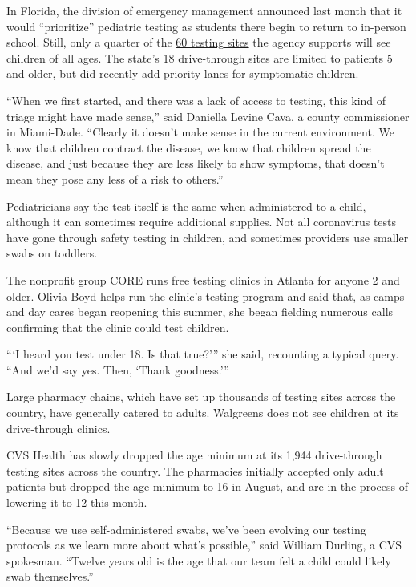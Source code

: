 In Florida, the division of emergency management announced last month
that it would ``prioritize'' pediatric testing as students there begin
to return to in-person school. Still, only a quarter of the
\href{https://www.floridadisaster.org/news-media/news/20200803-state-of-florida-prioritizes-symptomatic-vulnerable-and-pediatric-populations-at-state-supported-covid-19-testing-sites/}{60
testing sites} the agency supports will see children of all ages. The
state's 18 drive-through sites are limited to patients 5 and older, but
did recently add priority lanes for symptomatic children.

``When we first started, and there was a lack of access to testing, this
kind of triage might have made sense,'' said Daniella Levine Cava, a
county commissioner in Miami-Dade. ``Clearly it doesn't make sense in
the current environment. We know that children contract the disease, we
know that children spread the disease, and just because they are less
likely to show symptoms, that doesn't mean they pose any less of a risk
to others.''

Pediatricians say the test itself is the same when administered to a
child, although it can sometimes require additional supplies. Not all
coronavirus tests have gone through safety testing in children, and
sometimes providers use smaller swabs on toddlers.

The nonprofit group CORE runs free testing clinics in Atlanta for anyone
2 and older. Olivia Boyd helps run the clinic's testing program and said
that, as camps and day cares began reopening this summer, she began
fielding numerous calls confirming that the clinic could test children.

```I heard you test under 18. Is that true?''' she said, recounting a
typical query. ``And we'd say yes. Then, `Thank goodness.'''

Large pharmacy chains, which have set up thousands of testing sites
across the country, have generally catered to adults. Walgreens does not
see children at its drive-through clinics.

CVS Health has slowly dropped the age minimum at its 1,944 drive-through
testing sites across the country. The pharmacies initially accepted only
adult patients but dropped the age minimum to 16 in August, and are in
the process of lowering it to 12 this month.

``Because we use self-administered swabs, we've been evolving our
testing protocols as we learn more about what's possible,'' said William
Durling, a CVS spokesman. ``Twelve years old is the age that our team
felt a child could likely swab themselves.''

